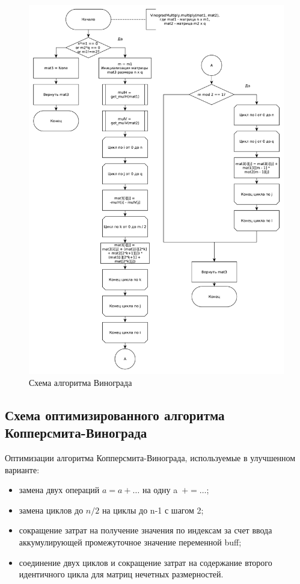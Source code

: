 \documentclass[a4paper,oneside,14pt]{extreport}
\begin{document}
\begin{figure}[H]
\includegraphics[width=1\linewidth]{images/vinograd}
\caption{Схема алгоритма Винограда}
\label{fig:vinograd}
\end{figure}


\subsection{Схема оптимизированного алгоритма Копперсмита-Винограда}
Оптимизации алгоритма Копперсмита-Винограда, используемые в улучшенном варианте:
\begin{itemize}
	\item замена двух операций $a = a + \ldots$ на одну a~$+= \ldots$;
	\item замена циклов до $n/2$ на циклы до n-1 с шагом 2;
	\item сокращение затрат на получение значения по индексам за счет ввода аккумулирующей промежуточное значение переменной buff;
	\item соединение двух циклов и сокращение затрат на содержание второго идентичного цикла для матриц нечетных размерностей.
\end{itemize}
\end{document}
